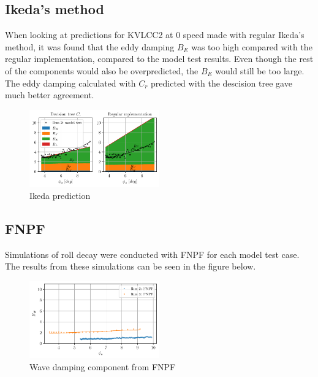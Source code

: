     \subsection{Ikeda's method}\label{ikedas-method}

    When looking at predictions for KVLCC2 at 0 speed made with regular
Ikeda's method, it was found that the eddy damping $B_E$ was too high
compared with the regular implementation, compared to the model test
results. Even though the rest of the components would also be
overpredicted, the $B_E$ would still be too large. The eddy damping
calculated with $C_r$ predicted with the descision tree gave much
better agreement.

    \begin{figure}[H]
        \begin{center}\includegraphics[width = 0.5\textwidth]{figures/ikeda.pdf}\end{center}
        \vspace{-1cm}
        \caption{Ikeda prediction}
        \label{fig:ikeda}
    \end{figure}
    
    \subsection{FNPF}\label{fnpf}

Simulations of roll decay were conducted with FNPF for each model test
case. The results from these simulations can be seen in the figure
below.

    \begin{figure}[H]
        \begin{center}\includegraphics[width = 0.5\textwidth]{figures/fnpf.pdf}\end{center}
        \vspace{-1cm}
        \caption{Wave damping component from FNPF}
        \label{fig:fnpf}
    \end{figure}
    
